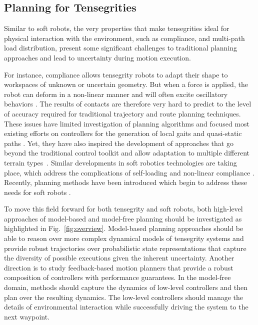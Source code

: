 
\subsection{Planning for Tensegrities}

Similar to soft robots, the very properties that make tensegrities
ideal for physical interaction with the environment, such as
compliance, and multi-path load distribution, present some significant
challenges to traditional planning approaches and lead to uncertainty
during motion execution.

For instance, compliance allows tensegrity robots to adapt their shape
to workspaces of unknown or uncertain geometry. But when a force is
applied, the robot can deform in a non-linear manner and will often
excite oscillatory behaviors \cite{SunSpiral2013Tensegrity-Base}.  The
results of contacts are therefore very hard to predict to the level of
accuracy required for traditional trajectory and route planning
techniques.  These issues have limited investigation of planning
algorithms and focused most existing efforts on controllers for the
generation of local gaits \cite{Paul2006a} and quasi-static
paths \cite{Porta:2015aa}. Yet, they have also inspired the
development of approaches that go beyond the traditional control
toolkit and allow adaptation to multiple different terrain
types~\cite{MirletzSoftRobotics,burms2015online}.  Similar
developments in soft robotics technologies are taking place, which
address the complications of self-loading and non-linear compliance
\cite{Rus:2015aa}.  Recently, planning methods have been introduced 
which begin to address these needs for soft
robots \cite{Bonilla:2015aa, Marchese:2016aa}.

To move this field forward for both tensegrity and soft robots, both
high-level approaches of model-based and model-free planning should be
investigated as highlighted in Fig.~\ref{fig:overview}.  Model-based
planning approaches should be able to reason over more complex
dynamical models of tensegrity systems and provide robust trajectories
over probabilistic state representations that capture the diversity of
possible executions given the inherent uncertainty. Another direction
is to study feedback-based motion planners that provide a robust
composition of controllers with performance guarantees. In the
model-free domain, methods should capture the dynamics of low-level
controllers and then plan over the resulting dynamics. The low-level
controllers should manage the details of environmental interaction
while successfully driving the system to the next waypoint.

